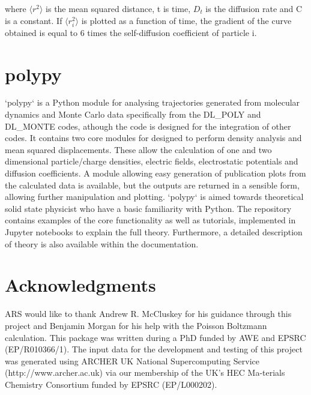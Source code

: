\documentclass[journal=jacsat,manuscript=article]{achemso}
\begin{document}
where $\Big \langle r^2 \big \rangle$ is the mean squared distance, t is time, $D_t$ is the diffusion rate and C is a constant. If $\Big \langle r_{i}^{2} \big \rangle$ is plotted as a function of time, the gradient of the curve obtained is equal to 6 times the self-diffusion coefficient of particle i.


\section{polypy}

`polypy` is a Python module for analysing trajectories generated from molecular dynamics and Monte Carlo data specifically from the DL\_POLY and DL\_MONTE codes, athough the code is designed for the integration of other codes.
It contains two core modules for designed to perform density analysis and mean squared displacements.
These allow the calculation of one and two dimensional particle/charge densities, electric fields, electrostatic potentials and diffusion coefficients. A module allowing easy generation of publication plots from the calculated data is available, but the outputs are returned in a sensible form, allowing further manipulation and plotting.
`polypy` is aimed towards theoretical solid state physicist who have a basic familiarity with Python.
The repository contains examples of the core functionality as well as tutorials, implemented in Jupyter notebooks to explain the full theory.
Furthermore, a detailed description of theory is also available within the documentation.

\section{Acknowledgments}

ARS would like to thank Andrew R. McCluskey for his guidance through this project and Benjamin Morgan for his help with the Poisson Boltzmann calculation. This package was written during a PhD funded by AWE and EPSRC (EP/R010366/1). The input data for the development and testing of this project was generated using ARCHER UK National Supercomputing Service (http://www.archer.ac.uk) via our membership of the UK's HEC Ma-terials Chemistry Consortium funded by EPSRC (EP/L000202).

\end{document}
